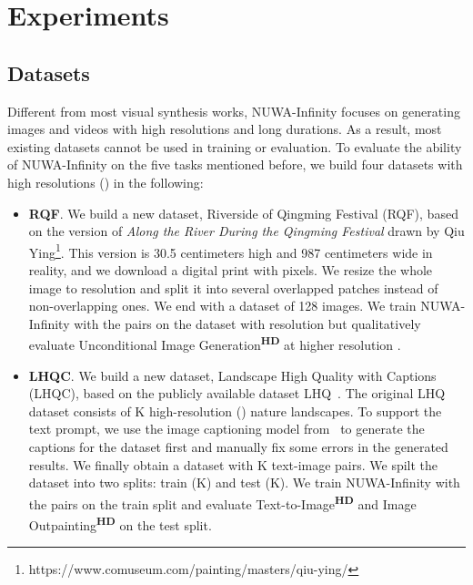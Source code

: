 \documentclass{article}
\begin{document}
\section{Experiments}
\vspace{-2mm}
\subsection{Datasets}
\vspace{-2mm}
Different from most visual synthesis works, NUWA-Infinity focuses on generating images and videos with high resolutions and long durations. As a result, most existing datasets cannot be used in training or evaluation. To evaluate the ability of NUWA-Infinity on the five tasks mentioned before, we build four datasets with high resolutions () in the following:
\begin{itemize}[leftmargin=*]

\item \textbf{RQF}. We build a new dataset, Riverside of Qingming Festival (RQF), based on the version of \emph{\textit{Along the River During the Qingming Festival}} drawn by Qiu Ying\footnote{https://www.comuseum.com/painting/masters/qiu-ying/}. This version is 30.5 centimeters high and 987 centimeters wide in reality, and we download a digital print with  pixels. We resize the whole image to  resolution and split it into several overlapped  patches instead of non-overlapping ones. We end with a dataset of 128 images.  We train NUWA-Infinity with the  pairs on the dataset with  resolution but qualitatively evaluate Unconditional Image Generation\textsuperscript{\textbf{HD}} at higher resolution .


\item \textbf{LHQC}. We build a new dataset, Landscape High Quality with Captions (LHQC), based on the publicly available dataset LHQ~\cite{skorokhodovAligningLatentImage2021}. The original LHQ dataset consists of K high-resolution () nature landscapes. To support the text prompt, we use the image captioning model from~\cite{wangGITGenerativeImagetotext2022} to generate the captions for the dataset first and manually fix some errors in the generated results. We finally obtain a dataset with K text-image pairs. We spilt the dataset into two splits: train (K) and test (K). We train NUWA-Infinity with the  pairs on the train split and evaluate Text-to-Image\textsuperscript{\textbf{HD}} and Image Outpainting\textsuperscript{\textbf{HD}} on the test split.


\end{itemize}
\end{document}
